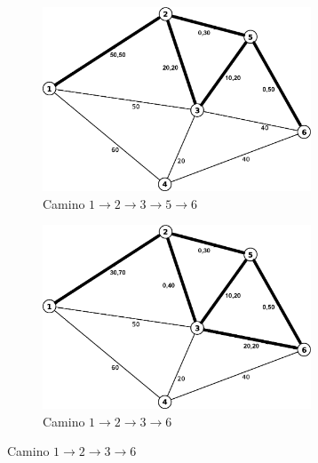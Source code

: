 \documentclass[12pt,letterpaper]{article}
\begin{document}
\begin{figure}[htbp]
        \begin{subfigure}[htbp]{8cm}
                \centering
                \includegraphics[width=8cm]{./it2.png}
                \caption{Camino $1\to2\to3\to5\to6$}
        \end{subfigure}
        \begin{subfigure}[htbp]{8cm}
                \centering
                \includegraphics[width=8cm]{./it3.png}
                \caption{Camino $1\to2\to3\to6$}
        \end{subfigure}
\end{figure}
\end{document}
